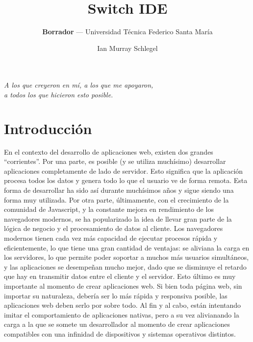 \documentclass[12pt,titlepage,]{article}
\title{Switch IDE}
\author{\textbf{Borrador} --- Universidad Técnica Federico Santa María}
\date{Ian Murray Schlegel}
\begin{document}
\maketitle


\begin{flushright}
\vspace*{\fill}

\textit{A los que creyeron en mí, a los que me apoyaron,\\a todos los que hicieron esto posible.}

\vspace*{\fill}
\end{flushright}

\newpage
\hypersetup{linkcolor=black} \tableofcontents

\clearpage
\newpage

\section{Introducción}


En el contexto del desarrollo de aplicaciones web, existen dos grandes
``corrientes''. Por una parte, es posible (y se utiliza muchísimo)
desarrollar aplicaciones completamente de lado de servidor. Esto
significa que la aplicación procesa todos los datos y genera todo lo que
el usuario ve de forma remota. Esta forma de desarrollar ha sido así
durante muchísimos años y sigue siendo una forma muy utilizada. Por otra
parte, últimamente, con el crecimiento de la comunidad de Javascript, y
la constante mejora en rendimiento de los navegadores modernos, se ha
popularizado la idea de llevar gran parte de la lógica de negocio y el
procesamiento de datos al cliente. Los navegadores modernos tienen cada
vez más capacidad de ejecutar procesos rápida y eficientemente, lo que
tiene una gran cantidad de ventajas: se aliviana la carga en los
servidores, lo que permite poder soportar a muchos más usuarios
simultáneos, y las aplicaciones se desempeñan mucho mejor, dado que se
disminuye el retardo que hay en transmitir datos entre el cliente y el
servidor. Esto último es muy importante al momento de crear aplicaciones
web. Si bien toda página web, sin importar su naturaleza, debería ser lo
más rápida y responsiva posible, las aplicaciones web deben serlo por
sobre todo. Al fin y al cabo, están intentando imitar el comportamiento
de aplicaciones nativas, pero a su vez alivianando la carga a la que se
somete un desarrollador al momento de crear aplicaciones compatibles con
una infinidad de dispositivos y sistemas operativos distintos.
\end{document}
